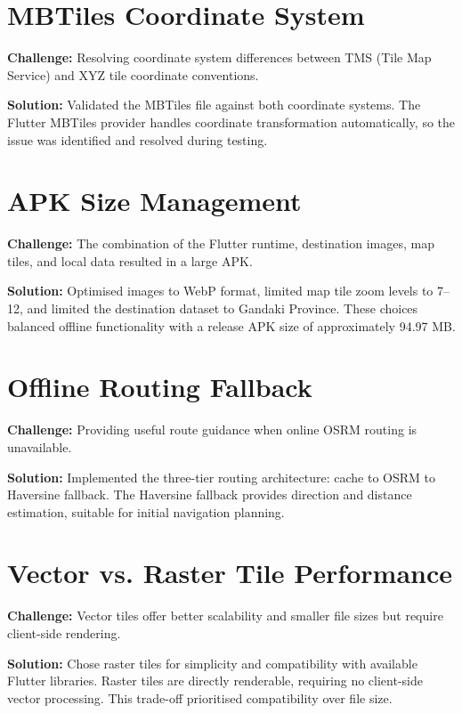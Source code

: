 \documentclass[12pt,a4paper,oneside]{report}
\begin{document}
\section{MBTiles Coordinate System}
\label{sec:ch_coords}

\textbf{Challenge:} Resolving coordinate system differences between TMS (Tile Map Service) and XYZ tile coordinate conventions.

\textbf{Solution:} Validated the MBTiles file against both coordinate systems. The Flutter MBTiles provider handles coordinate transformation automatically, so the issue was identified and resolved during testing.

\section{APK Size Management}
\label{sec:ch_apk_size}

\textbf{Challenge:} The combination of the Flutter runtime, destination images, map tiles, and local data resulted in a large APK.

\textbf{Solution:} Optimised images to WebP format, limited map tile zoom levels to 7--12, and limited the destination dataset to Gandaki Province. These choices balanced offline functionality with a release APK size of approximately 94.97 MB.

\section{Offline Routing Fallback}
\label{sec:ch_routing}

\textbf{Challenge:} Providing useful route guidance when online OSRM routing is unavailable.

\textbf{Solution:} Implemented the three-tier routing architecture: cache to OSRM to Haversine fallback. The Haversine fallback provides direction and distance estimation, suitable for initial navigation planning.

\section{Vector vs. Raster Tile Performance}
\label{sec:ch_vector}

\textbf{Challenge:} Vector tiles offer better scalability and smaller file sizes but require client-side rendering.

\textbf{Solution:} Chose raster tiles for simplicity and compatibility with available Flutter libraries. Raster tiles are directly renderable, requiring no client-side vector processing. This trade-off prioritised compatibility over file size.
\end{document}
